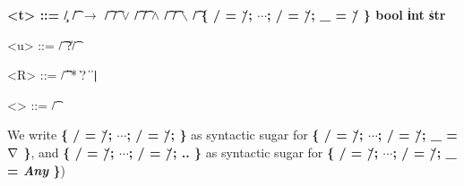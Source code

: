 \begin{grammar}
  \bfseries
  <t> ::= \c/ \| \t/ $\bm{\rightarrow}$ \t/
    \alt \t/ $\bm{\vee}$ \t/ \| \t/ $\bm{\wedge}$ \t/ \| \t/ $\bm{\backslash}$ \t/
    \alt [\meta{R}]
    \alt \{ \s/ = \u/; $\cdots{}$; \s/ = \u/; _ = \u/ \}
    \alt bool \| int \| str

  <u> ::= \t/ \| ?\t/

  <R> ::= \t/ \|  \| * \| ?
    \|   \| \texttt{|}

  <\τ> ::= \t/ %
\end{grammar}

We write \textbf{\{ \s/ = \u/; $\cdots{}$; \s/ = \u/; \}} as syntactic
sugar for \textbf{\{ \s/ = \u/; $\cdots{}$; \s/ = \u/; _ = $\nabla$ \}}, and
\textbf{\{ \s/ = \u/; $\cdots{}$; \s/ = \u/; .. \}} as syntactic sugar for
\textbf{\{ \s/ = \u/; $\cdots{}$; \s/ = \u/; _ = \textmd{\emph{Any}} \}})

